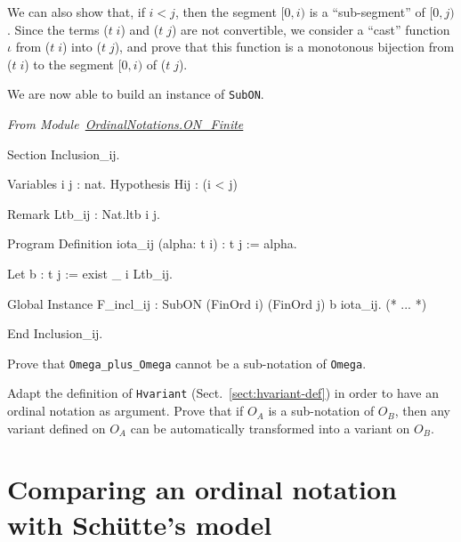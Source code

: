We can also show that, if $i<j$, then the segment $[0,i)$ is a ``sub-segment'' of
$[0,j)$. Since the terms  ($t\;i$) and ($t\;j$) are not convertible, we consider a ``cast'' 
function $\iota$ from ($t\;i$) into ($t\;j$), and prove that this function is  a monotonous bijection  from ($t\;i$) to
the segment $[0,i)$ of ($t\;j$).




 




We are now able to build an instance of \texttt{SubON}. 

\vspace{4pt}
\noindent\emph{From Module~\href{../theories/html/hydras.OrdinalNotations.ON_Finite.html}{OrdinalNotations.ON\_Finite}}

\begin{Coqsrc}
Section Inclusion_ij.

  Variables i j : nat.
  Hypothesis Hij : (i < j)%

  Remark Ltb_ij : Nat.ltb i j.

  Program Definition iota_ij  (alpha: t i) : t j :=  alpha.
 
   Let b : t j := exist _ i Ltb_ij.
   
   Global Instance F_incl_ij  : SubON  (FinOrd i) (FinOrd j) b iota_ij.
  (* ... *)

  End Inclusion_ij.
\end{Coqsrc}
         


\begin{exercise}
Prove that \texttt{Omega\_plus\_Omega} cannot be a sub-notation of \texttt{Omega}.
\end{exercise}

\begin{project}
Adapt the definition of \texttt{Hvariant} (Sect.~\ref{sect:hvariant-def}) in order to
have an ordinal notation as argument. Prove that if $O_A$ is a sub-notation of $O_B$, then any variant defined on  $O_A$ can be automatically transformed into 
a variant on $O_B$.
\end{project}




\section{Comparing an ordinal notation with Schütte's model}

